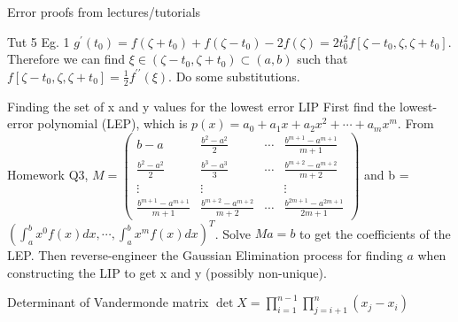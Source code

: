 \documentclass[10pt,landscape]{article}
\theoremstyle{definition}
\newcommand{\thistheoremname}{}
\newtheorem*{genericthm*}{\thistheoremname}
\newenvironment{namedthm*}[1]
{\renewcommand{\thistheoremname}{#1}\begin{genericthm*}}
{\end{genericthm*}}
\begin{document}
\begin{multicols}{3}
\begin{namedthm*}{Error proofs from lectures/tutorials}
\begin{namedthm*}{Tut 5 Eg. 1}
			\(
			g^{\prime}\left(t_{0}\right)=f\left(\zeta+t_{0}\right)+f\left(\zeta-t_{0}\right)-2 f(\zeta)=2 t_{0}^{2} f\left[\zeta-t_{0}, \zeta, \zeta+t_{0}\right]
			\). Therefore we can find \(\xi \in\left(\zeta-t_{0}, \zeta+t_{0}\right) \subset(a, b)\) such that
			\(
			f\left[\zeta-t_{0}, \zeta, \zeta+t_{0}\right]=\frac{1}{2} f^{\prime \prime}(\xi)
			\). Do some substitutions.
		\end{namedthm*}
	\end{namedthm*}
	\begin{namedthm*}{Finding the set of x and y values for the lowest error LIP}
		First find the lowest-error polynomial (LEP), which is \(p(x)=a_{0}+a_{1} x+a_{2} x^{2}+\cdots+a_{m} x^{m}\). From Homework Q3, \(M=\left(\begin{array}{cccc}{b-a} & {\frac{b^{2}-a^{2}}{2}} & {\cdots} & {\frac{b^{m+1}-a^{m+1}}{m+1}} \\ {\frac{b^{2}-a^{2}}{2}} & {\frac{b^{3}-a^{3}}{3}} & {\cdots} & {\frac{b^{m+2}-a^{m+2}}{m+2}} \\ {\vdots} & {\vdots} & {} & {\vdots} \\ {\frac{b^{m+1}-a^{m+1}}{m+1}} & {\frac{b^{m+2}-a^{m+2}}{m+2}} & {\cdots} & {\frac{b^{2 m+1}-a^{2 m+1}}{2 m+1}}\end{array}\right)\) and b = \(\left(\int_{a}^{b} x^{0} f(x) d x, \cdots, \int_{a}^{b} x^{m} f(x) d x\right)^{T}\). Solve \(Ma = b\) to get the coefficients of the LEP. Then reverse-engineer the Gaussian Elimination process for finding \(a\) when constructing the LIP to get x and y (possibly non-unique).
	\end{namedthm*}
	\begin{namedthm*}{Determinant of Vandermonde matrix}
		\(\operatorname{det} X=\prod_{i=1}^{n-1} \prod_{j=i+1}^{n}\left(x_{j}-x_{i}\right)\)
	\end{namedthm*}
\end{multicols}
\end{document}
